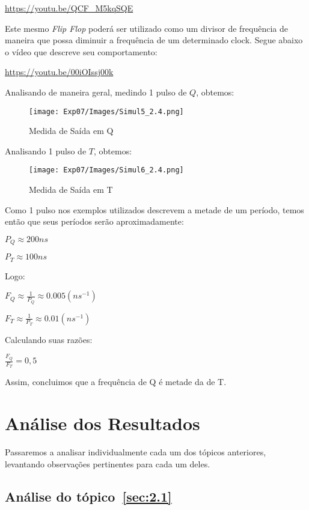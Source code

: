 \documentclass[12pt]{article}
\begin{document}
\href{https://youtu.be/QCF_M5kqSQE}{https://youtu.be/QCF_M5kqSQE}

Este mesmo \emph{Flip Flop} poderá ser utilizado como um divisor de frequência
de maneira que possa diminuir a frequência de um determinado clock. Segue abaixo
o vídeo que descreve seu comportamento:

\href{https://youtu.be/00iOIssj00k}{https://youtu.be/00iOIssj00k}

Analisando de maneira geral, medindo 1 pulso de $Q$, obtemos:
\begin{figure}[H]
  \centering
  \texttt{[image: Exp07/Images/Simul5\_2.4.png]}
  \caption{Medida de Saída em Q}\label{fig:flip-flop-jk-q.png}
\end{figure}

Analisando 1 pulso de $T$, obtemos:
\begin{figure}[H]
  \centering
  \texttt{[image: Exp07/Images/Simul6\_2.4.png]}
  \caption{Medida de Saída em T}\label{fig:flip-flop-jk-t.png}
\end{figure}

Como 1 pulso nos exemplos utilizados descrevem a metade de um período, temos
então que seus períodos serão aproximadamente:

    $P_{Q} \approx 200ns$
    
    $P_{T} \approx 100ns$
    
Logo:

    $F_{Q} \approx \frac{1}{P_{Q}} \approx 0.005(ns^{-1})$
    
    $F_{T} \approx \frac{1}{P_{T}} \approx 0.01(ns^{-1})$
    
Calculando suas razões:
    
    $\frac{F_{Q}}{F_{T}} = 0,5$
    
Assim, concluimos que a frequência de Q é metade da de T.


\section{Análise dos Resultados}\label{sec:resultados}

Passaremos a analisar individualmente cada um dos tópicos anteriores, levantando
observações pertinentes para cada um deles.

\subsection{Análise do tópico~\ref{sec:2.1}}\label{sec:analise2.1}
\end{document}
